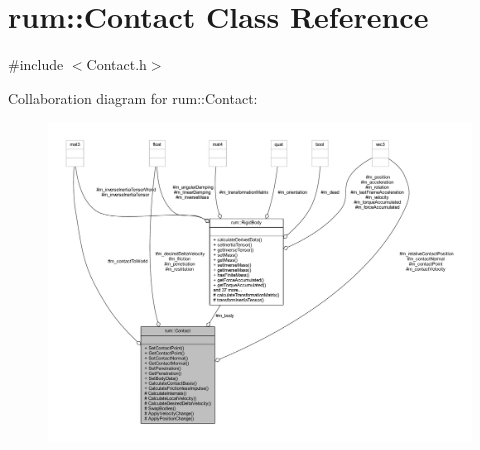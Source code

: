 \hypertarget{classrum_1_1_contact}{}\section{rum\+:\+:Contact Class Reference}
\label{classrum_1_1_contact}


{\ttfamily \#include $<$Contact.\+h$>$}



Collaboration diagram for rum\+:\+:Contact\+:\nopagebreak
\begin{figure}[H]
\begin{center}
\leavevmode
\includegraphics[width=350pt]{classrum_1_1_contact__coll__graph}
\end{center}
\end{figure}

